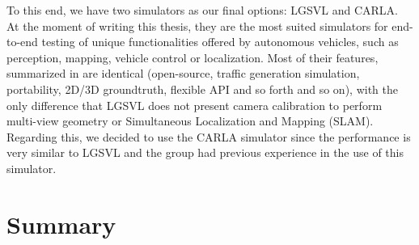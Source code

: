 To this end, we have two simulators as our final options: LGSVL and \ac{CARLA}. At the moment of writing this thesis, they are the most suited simulators for end-to-end testing of unique functionalities offered by autonomous vehicles, such as perception, mapping, vehicle control or localization. Most of their features, summarized in \cite{kaur2021survey} are identical (open-source, traffic generation simulation, portability, 2D/3D groundtruth, flexible API and so forth and so on), with the only difference that LGSVL does not present camera calibration to perform multi-view geometry or Simultaneous Localization and Mapping (SLAM). Regarding this, we decided to use the \ac{CARLA} simulator since the performance is very similar to LGSVL and the group had previous experience in the use of this simulator. %

\section{Summary}
\label{sec:2_summary}

